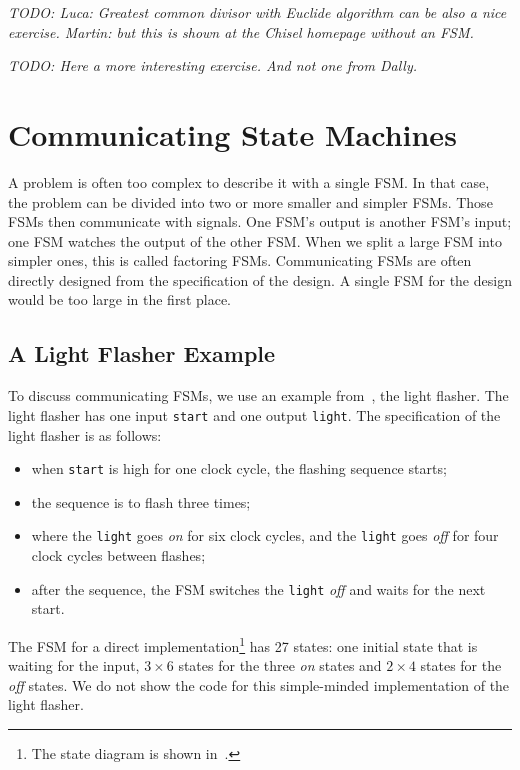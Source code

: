 \documentclass[%
    10pt,
    headinclude, footexclude,
    openright, %
    notitlepage,
    cleardoubleempty,
    headsepline,
    pointlessnumbers,
    bibtotoc, idxtotoc,
    ]{scrbook}
\newcommand{\code}[1]{{\lstinline[basicstyle=\small\ttfamily]{#1}}}
\newcommand{\todo}[1]{{\emph{TODO: #1}}}
\begin{document}
\todo{Luca: Greatest common divisor with Euclide algorithm can be also a nice exercise.
Martin: but this is shown at the Chisel homepage without an FSM.}

\todo{Here a more interesting exercise. And not one from Dally.}

\chapter{Communicating State Machines}

A problem is often too complex to describe it with a single FSM.
In that case, the problem can be divided into two or more smaller and simpler FSMs.
Those FSMs then communicate with signals. One FSM's output is
another FSM's input; one FSM watches the output of the other FSM.
When we split a large FSM into simpler ones, this is called factoring FSMs.
Communicating FSMs are often directly designed from the specification
of the design. A single FSM for the design would be too large in the first place.

\section{A Light Flasher Example}

To discuss communicating FSMs, we use an example
from~\cite[Chapter~17]{dally:vhdl:2016}, the light flasher.
The light flasher has one input \code{start} and one output
\code{light}. The specification of the light flasher is as follows:
\begin{itemize}
\item when \code{start} is high for one clock cycle, the flashing
sequence starts;
\item the sequence is to flash three times;
\item where the \code{light} goes \emph{on} for six clock cycles, and the \code{light} goes \emph{off} for four clock cycles between flashes;
\item after the sequence, the FSM switches the \code{light} \emph{off} and waits
for the next start.
\end{itemize}

The FSM for a direct implementation\footnote{The state diagram is shown
in~\cite[p.~376]{dally:vhdl:2016}.} has 27 states:
one initial state that is waiting for the input, $3 \times 6$ states for the three
\emph{on} states and $2 \times 4$ states for the \emph{off} states.
We do not show the code for this simple-minded implementation of the light
flasher.
\end{document}
